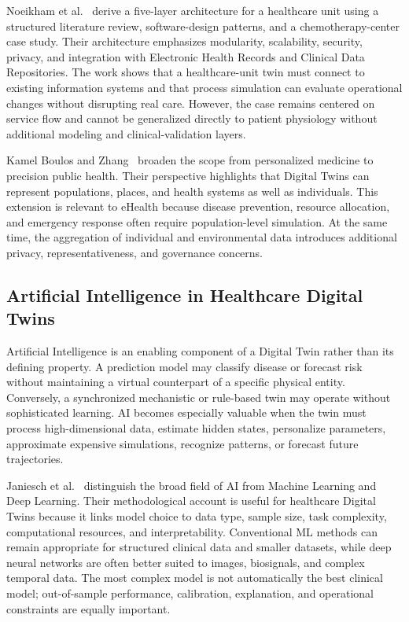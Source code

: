 Noeikham et al.~\cite{noeikham2024architecture} derive a five-layer architecture for a healthcare unit using a structured literature review, software-design patterns, and a chemotherapy-center case study. Their architecture emphasizes modularity, scalability, security, privacy, and integration with Electronic Health Records and Clinical Data Repositories. The work shows that a healthcare-unit twin must connect to existing information systems and that process simulation can evaluate operational changes without disrupting real care. However, the case remains centered on service flow and cannot be generalized directly to patient physiology without additional modeling and clinical-validation layers.

Kamel Boulos and Zhang~\cite{boulos2021digital} broaden the scope from personalized medicine to precision public health. Their perspective highlights that Digital Twins can represent populations, places, and health systems as well as individuals. This extension is relevant to eHealth because disease prevention, resource allocation, and emergency response often require population-level simulation. At the same time, the aggregation of individual and environmental data introduces additional privacy, representativeness, and governance concerns.

\subsection{Artificial Intelligence in Healthcare Digital Twins}
Artificial Intelligence is an enabling component of a Digital Twin rather than its defining property. A prediction model may classify disease or forecast risk without maintaining a virtual counterpart of a specific physical entity. Conversely, a synchronized mechanistic or rule-based twin may operate without sophisticated learning. AI becomes especially valuable when the twin must process high-dimensional data, estimate hidden states, personalize parameters, approximate expensive simulations, recognize patterns, or forecast future trajectories.

Janiesch et al.~\cite{janiesch2021machine} distinguish the broad field of AI from Machine Learning and Deep Learning. Their methodological account is useful for healthcare Digital Twins because it links model choice to data type, sample size, task complexity, computational resources, and interpretability. Conventional ML methods can remain appropriate for structured clinical data and smaller datasets, while deep neural networks are often better suited to images, biosignals, and complex temporal data. The most complex model is not automatically the best clinical model; out-of-sample performance, calibration, explanation, and operational constraints are equally important.

